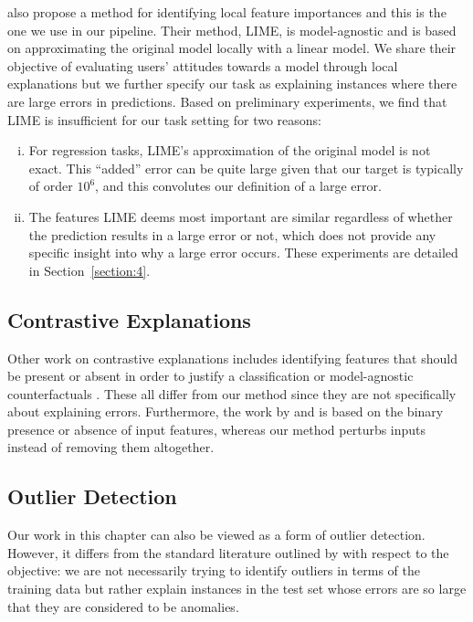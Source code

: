 \citet{ribeiro-2016-should} also propose a method for identifying local feature importances and this is the one we use in our pipeline. 
Their method, LIME, is model-agnostic and is based on approximating the original model locally with a linear model. 
We share their objective of evaluating users' attitudes towards a model through local explanations but we further specify our task as explaining instances where there are large errors in predictions. 
Based on preliminary experiments, we find that LIME is insufficient for our task setting for two reasons: 
\begin{enumerate}[(i)]
\item For regression tasks, LIME's approximation of the original model is not exact. This ``added'' error can be quite large given that our target is typically of order $10^6$, and this convolutes our definition of a large error.
\item The features LIME deems most important are similar regardless of whether the prediction results in a large error or not, which does not provide any specific insight into why a large error occurs. These experiments are detailed in Section~\ref{section:4}.
\end{enumerate}

\noindent%
\subsection{Contrastive Explanations}
Other work on contrastive explanations includes identifying features that should be present or absent in order to justify a classification  \citep{dhurandhar_explanations_2018, ferrari_grounding_2018} or model-agnostic counterfactuals \citep{wachter_counterfactual_2017, russell_efficient_2019}. 
These all differ from our method since they are not specifically about explaining errors. 
Furthermore, the work by \citet{dhurandhar_explanations_2018} and \citet{ferrari_grounding_2018} is based on the binary presence or absence of input features, whereas our method perturbs inputs instead of removing them altogether. 

\subsection{Outlier Detection}

Our work in this chapter can also be viewed as a form of outlier detection. 
However, it differs from the standard literature outlined by \citet{pimentel-2014-review} with respect to the objective: we are not necessarily trying to identify outliers in terms of the training data but rather explain instances in the test set whose errors are so large  that they are considered to be anomalies. 


